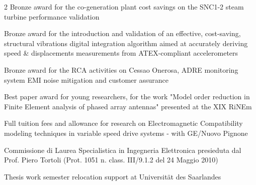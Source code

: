 \documentclass[9.5pt,a4paper,ragged2e,withhyper]{altacv} %
\begin{document}
\begin{paracol}{2}
{Bronze award for the co-generation plant cost savings on the SNC1-2 steam turbine performance validation}
\divider

{Bronze award for the introduction and validation of an effective, cost-saving, structural vibrations digital integration algorithm aimed at accurately deriving speed \& displacements measurements from ATEX-compliant accelerometers}
\divider

{Bronze award for the RCA activities on Cessao Onerosa, ADRE monitoring system EMI noise mitigation and customer assurance}
\divider

{Best paper award for young researchers, for the work "Model order reduction in Finite Element analysis of phased array antennas" presented at the XIX RiNEm}
\divider

{Full tuition fees and allowance for research on Electromagnetic Compatibility modeling techniques in variable speed drive systems - with GE/Nuovo Pignone}
\divider

{Commissione di Laurea Specialistica in Ingegneria Elettronica presieduta dal Prof. Piero Tortoli (Prot. 1051 n. class. III/9.1.2 del 24 Maggio 2010)}
\divider

{Thesis work semester relocation support at Universit\"at des Saarlandes}


\medskip
{}
\medskip
{}
\medskip
{}




\end{paracol}
\end{document}
